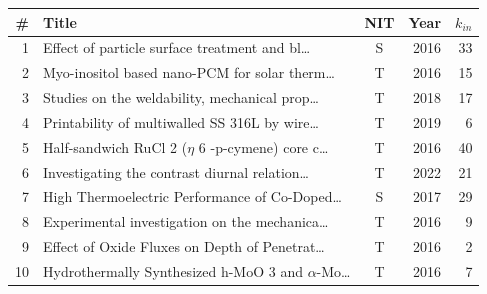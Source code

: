 \begin{tabular}{@{}rp{5.15cm}crr@{}}
\toprule
\# & Title & NIT & Year & $k_{in}$ \\
\midrule
1 & Effect of particle surface treatment and bl\ldots{} & S & 2016 & 33 \\
2 & Myo-inositol based nano-PCM for solar therm\ldots{} & T & 2016 & 15 \\
3 & Studies on the weldability, mechanical prop\ldots{} & T & 2018 & 17 \\
4 & Printability of multiwalled SS 316L by wire\ldots{} & T & 2019 & 6 \\
5 & Half-sandwich RuCl 2 ($\eta$ 6 -p-cymene) core c\ldots{} & T & 2016 & 40 \\
6 & Investigating the contrast diurnal relation\ldots{} & T & 2022 & 21 \\
7 & High Thermoelectric Performance of Co-Doped\ldots{} & S & 2017 & 29 \\
8 & Experimental investigation on the mechanica\ldots{} & T & 2016 & 9 \\
9 & Effect of Oxide Fluxes on Depth of Penetrat\ldots{} & T & 2016 & 2 \\
10 & Hydrothermally Synthesized h-MoO 3 and $\alpha$-Mo\ldots{} & T & 2016 & 7 \\
\bottomrule
\end{tabular}
